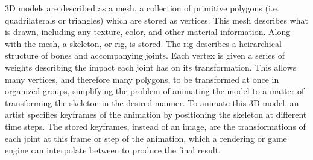 3D models are described as a mesh, a collection of primitive polygons (i.e. quadrilaterals or triangles) which are stored as vertices.  This mesh describes what is drawn, including any texture, color, and other material information.  Along with the mesh, a skeleton, or rig, is stored.  The rig describes a heirarchical structure of bones and accompanying joints.  Each vertex is given a series of weights describing the impact each joint has on its transformation.  This allows many vertices, and therefore many polygons, to be transformed at once in organized groups, simplifying the problem of animating the model to a matter of transforming the skeleton in the desired manner.  To animate this 3D model, an artist specifies keyframes of the animation by positioning the skeleton at different time steps.  The stored keyframes, instead of an image, are the transformations of each joint at this frame or step of the animation, which a rendering or game engine can interpolate between to produce the final result.

